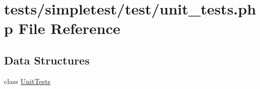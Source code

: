 \hypertarget{unit__tests_8php}{\section{tests/simpletest/test/unit\-\_\-tests.php File Reference}
\label{unit__tests_8php}
}
\subsection*{Data Structures}
\begin{DoxyCompactItemize}
\item 
class \hyperlink{class_unit_tests}{Unit\-Tests}
\end{DoxyCompactItemize}
